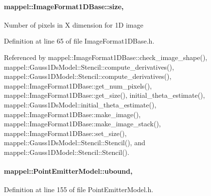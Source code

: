 \paragraph[{\texorpdfstring{size}{size}}]{ mappel\+::\+Image\+Format1\+D\+Base\+::size\hspace{0.3cm}{\ttfamily [protected]}, {\ttfamily [inherited]}}\hypertarget{classmappel_1_1ImageFormat1DBase_a8941b4d028e4dd881146a7c1b9039bb1}{}\label{classmappel_1_1ImageFormat1DBase_a8941b4d028e4dd881146a7c1b9039bb1}
Number of pixels in X dimension for 1D image 

Definition at line 65 of file Image\+Format1\+D\+Base.\+h.



Referenced by mappel\+::\+Image\+Format1\+D\+Base\+::check\+\_\+image\+\_\+shape(), mappel\+::\+Gauss1\+Ds\+Model\+::\+Stencil\+::compute\+\_\+derivatives(), mappel\+::\+Gauss1\+D\+Model\+::\+Stencil\+::compute\+\_\+derivatives(), mappel\+::\+Image\+Format1\+D\+Base\+::get\+\_\+num\+\_\+pixels(), mappel\+::\+Image\+Format1\+D\+Base\+::get\+\_\+size(), initial\+\_\+theta\+\_\+estimate(), mappel\+::\+Gauss1\+Ds\+Model\+::initial\+\_\+theta\+\_\+estimate(), mappel\+::\+Image\+Format1\+D\+Base\+::make\+\_\+image(), mappel\+::\+Image\+Format1\+D\+Base\+::make\+\_\+image\+\_\+stack(), mappel\+::\+Image\+Format1\+D\+Base\+::set\+\_\+size(), mappel\+::\+Gauss1\+Ds\+Model\+::\+Stencil\+::\+Stencil(), and mappel\+::\+Gauss1\+D\+Model\+::\+Stencil\+::\+Stencil().

\paragraph[{\texorpdfstring{ubound}{ubound}}]{ mappel\+::\+Point\+Emitter\+Model\+::ubound\hspace{0.3cm}{\ttfamily [protected]}, {\ttfamily [inherited]}}\hypertarget{classmappel_1_1PointEmitterModel_a35b883e84b6a2e0093bdf482c623beef}{}\label{classmappel_1_1PointEmitterModel_a35b883e84b6a2e0093bdf482c623beef}


Definition at line 155 of file Point\+Emitter\+Model.\+h.



